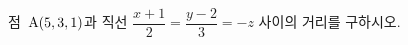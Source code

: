 점~$\mathrm{A}(5{,}\mkern3mu\mathopen{}3{,}\mkern3mu\mathopen{}1)$과 직선 $\dfrac{x+1}{2}=\dfrac{y-2}{3}=-z$ 사이의 거리를 구하시오.
